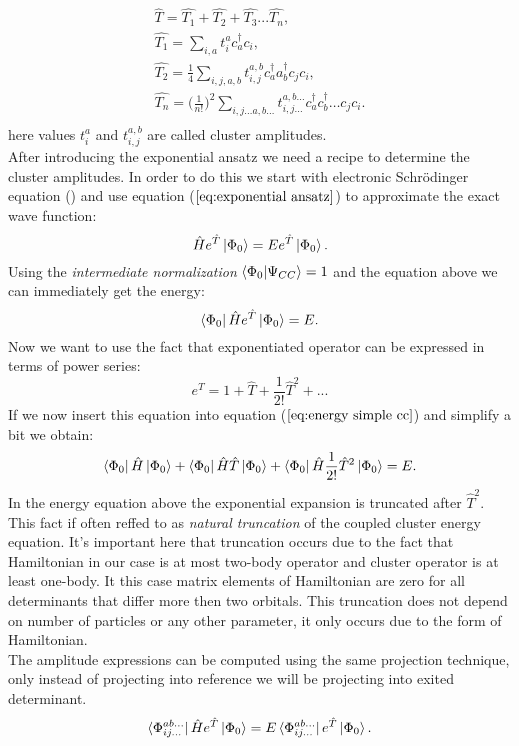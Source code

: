 \documentclass[twoside,english]{uiofysmaster}
\theoremstyle{definition}
\begin{document}
\begin{align} \label{eq:T}
\hat{T}= \hat{T_1}+ \hat{T_2}+ \hat{T_3}...\hat{T_n},  \\
\hat{T_1}= \sum_{i,a} t_i^a c_a^\dagger c_i, \label{eq:T1}\\
\hat{T_2}= \frac{1}{4} \sum_{i,j,a,b} t_{i,j}^{a,b} c_a^\dagger a_b^\dagger c_j c_i,\\
\hat{T_n}= \bigg(\frac{1}{n!}\bigg)^2 \sum_{i,j \dots a,b\dots } t_{i,j\dots}^{a,b\dots}  c_a^\dagger c_b^\dagger \dots c_j c_i.\\
\end{align}
here values $t_i^a $ and $t_{i,j}^{a,b}$ are called cluster amplitudes. \\
After introducing the exponential ansatz we need a recipe to determine the cluster amplitudes. In order to do this we start with electronic Schr\"{o}dinger equation () and use equation ($\ref{eq:exponential ansatz}$) to approximate the exact wave function:
\begin{equation}
	\hat{H}e^{\hat{T}}\ket{\Phi_0}=Ee^{\hat{T}}\ket{\Phi_0}.
\end{equation}
Using the \textit{intermediate normalization} $\braket{\Phi_0|\Psi_{CC}}=1$ and  the equation above we can immediately get the energy:
\begin{equation}\label{eq:energy simple cc}
\bra{\Phi_0}\hat{H}e^{\hat{T}}\ket{\Phi_0}=E.
\end{equation}
Now we want to use the fact that exponentiated operator can be expressed in terms of power series:
 \begin{equation}
 e^{\hat{T}}= 1+ \hat{T}+\frac{1}{2!}\hat{T}^2+ ...
 \end{equation}
If we now insert this equation into equation ($\ref{eq:energy simple cc}$) and simplify a bit we obtain:
\begin{equation}
 \bra{\Phi_0}\hat{H}\ket{\Phi_0} +  \bra{\Phi_0}\hat{H}\hat{T}\ket{\Phi_0} +\bra{\Phi_0}\hat{H}\frac{1}{2!}\hat{T}^2\ket{\Phi_0}  = E.
\end{equation}
In the energy equation above the exponential expansion is truncated after $\hat{T}^2$. This fact if often reffed to as \textit{natural truncation} of the coupled cluster energy equation. It's important here that truncation occurs due to the fact that Hamiltonian in our case is at most two-body operator and cluster operator is at least one-body. It this case matrix elements of Hamiltonian are zero for all determinants that differ more then two orbitals. This truncation does not depend on number of particles or any other parameter, it only occurs due to the form of Hamiltonian. \\
The amplitude expressions can be computed using the same projection technique, only instead of projecting into reference we will be projecting into exited determinant. 
\begin{equation}\label{eq:ampl simple}
\bra{\Phi_{ij...}^{ab...}}\hat{H} e^{\hat{T}}\ket{\Phi_0} = E\bra{\Phi_{ij...}^{ab...}} e^{\hat{T}}\ket{\Phi_0}.
\end{equation}
\end{document}
